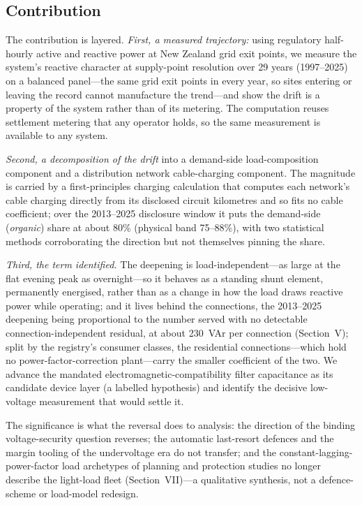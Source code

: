 \documentclass[journal]{IEEEtran}
\begin{document}
\subsection{Contribution}
The contribution is layered. \emph{First, a measured trajectory:} using
regulatory half-hourly active and reactive power at New Zealand grid exit points,
we measure the system's reactive character at supply-point resolution over 29
years (1997--2025) on a balanced panel---the same grid exit points in every year,
so sites entering or leaving the record cannot manufacture the trend---and show
the drift is a property of the system rather than of its metering. The computation reuses settlement metering that any operator holds, so the same
measurement is available to any system.

\emph{Second, a decomposition of the drift} into a demand-side load-composition
component and a distribution network cable-charging component. The magnitude is carried by a
first-principles charging calculation that computes each network's cable charging
directly from its disclosed circuit kilometres and so fits no cable coefficient;
over the 2013--2025 disclosure window it puts the demand-side (\emph{organic})
share at about 80\% (physical band 75--88\%), with two statistical methods
corroborating the direction but not themselves pinning the share.

\emph{Third, the term identified.} The deepening is load-independent---as large
at the flat evening peak as overnight---so it behaves as a standing shunt
element, permanently energised, rather than as a change in how the load draws
reactive power while operating; and it lives behind the connections, the
2013--2025 deepening being proportional to the number served with no detectable
connection-independent residual, at about 230~VAr per connection (Section~V);
split by the registry's consumer classes, the residential connections---which
hold no power-factor-correction plant---carry the smaller coefficient of
the two. We
advance the mandated electromagnetic-compatibility filter capacitance as its
candidate device layer (a labelled hypothesis) and identify the decisive
low-voltage measurement that would settle it.

The significance is what the reversal does to analysis: the direction of the
binding voltage-security question reverses; the automatic last-resort defences
and the margin tooling of the undervoltage era do not transfer; and the
constant-lagging-power-factor load archetypes of planning and protection studies
no longer describe the light-load fleet (Section~VII)---a qualitative synthesis,
not a defence-scheme or load-model redesign.
\end{document}
